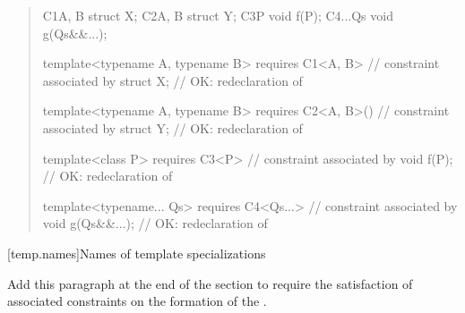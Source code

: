 \begin{quote}
\begin{codeblock}
C1{A, B} struct X;
C2{A, B} struct Y;
C3{P} void f(P);
C4{...Qs} void g(Qs&&...);

template<typename A, typename B> 
  requires C1<A, B> // constraint associated by 
    struct X;       // OK: redeclaration of 

template<typename A, typename B> 
  requires C2<A, B>()  // constraint associated by 
    struct Y;          // OK: redeclaration of 

template<class P>
  requires C3<P> // constraint associated by 
    void f(P);   // OK: redeclaration of 

template<typename... Qs>
  requires C4<Qs...> // constraint associated by 
    void g(Qs&&...); // OK: redeclaration of 
\end{codeblock}
\exitexample

\end{quote}

[temp.names]{Names of template specializations}

Add this paragraph at the end of the section to require the satisfaction of 
associated constraints on the formation of the .

